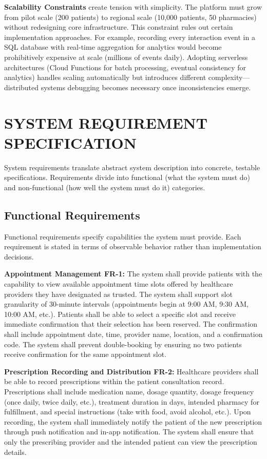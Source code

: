 \documentclass[12pt,a4paper]{report}
\begin{document}
\textbf{Scalability Constraints} create tension with simplicity. The platform must grow from pilot scale (200 patients) to regional scale (10,000 patients, 50 pharmacies) without redesigning core infrastructure. This constraint rules out certain implementation approaches. For example, recording every interaction event in a SQL database with real-time aggregation for analytics would become prohibitively expensive at scale (millions of events daily). Adopting serverless architectures (Cloud Functions for batch processing, eventual consistency for analytics) handles scaling automatically but introduces different complexity—distributed systems debugging becomes necessary once inconsistencies emerge.

\section{SYSTEM REQUIREMENT SPECIFICATION}

System requirements translate abstract system description into concrete, testable specifications. Requirements divide into functional (what the system must do) and non-functional (how well the system must do it) categories.

\subsection{Functional Requirements}

Functional requirements specify capabilities the system must provide. Each requirement is stated in terms of observable behavior rather than implementation decisions.

\textbf{Appointment Management FR-1:} The system shall provide patients with the capability to view available appointment time slots offered by healthcare providers they have designated as trusted. The system shall support slot granularity of 30-minute intervals (appointments begin at 9:00 AM, 9:30 AM, 10:00 AM, etc.). Patients shall be able to select a specific slot and receive immediate confirmation that their selection has been reserved. The confirmation shall include appointment date, time, provider name, location, and a confirmation code. The system shall prevent double-booking by ensuring no two patients receive confirmation for the same appointment slot.

\textbf{Prescription Recording and Distribution FR-2:} Healthcare providers shall be able to record prescriptions within the patient consultation record. Prescriptions shall include medication name, dosage quantity, dosage frequency (once daily, twice daily, etc.), treatment duration in days, intended pharmacy for fulfillment, and special instructions (take with food, avoid alcohol, etc.). Upon recording, the system shall immediately notify the patient of the new prescription through push notification and in-app notification. The system shall ensure that only the prescribing provider and the intended patient can view the prescription details.
\end{document}
